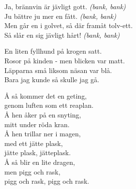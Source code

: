 \documentclass[a6paper,10pt]{article}
\begin{document}
\newpage
\setlength{\oddsidemargin}{-0.37in}
\noindent
Ja, brännvin är jävligt gott. \textit{(bank, bank)}\\
Ju bättre ju mer en fått. \textit{(bank, bank)}\\
Men går en i golvet, så där framåt tolv-ett. \\
Så slår en sig jävligt hårt! \textit{(bank, bank)}
\vspace{20pt}
\begin{center}
\end{center}
\begin{lyrics}
En liten fyllhund på krogen satt. \\
Rosor på kinden - men blicken var matt. \\
Läpparna små liksom näsan var blå. \\
Bara jag kunde så skulle jag gå. 
\end{lyrics}
\vspace{20pt}
\begin{center}
\end{center}
\begin{lyrics}
Å så kommer det en geting, \\
genom luften som ett reaplan. \\
Å hen åker på en snyting, \\
mitt under röda kran. \\
Å hen trillar ner i magen, \\
med ett jätte plask, \\
jätte plask, jätteplask. \\
Å så blir en lite dragen, \\
men pigg och rask, \\
pigg och rask, pigg och rask. 
\end{lyrics}
\end{document}
